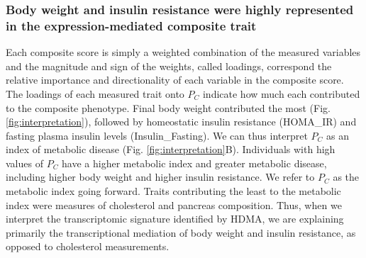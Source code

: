 \documentclass[
]{article}
\begin{document}
\subsubsection{Body weight and insulin resistance were highly
represented in the expression-mediated composite
trait}\label{body-weight-and-insulin-resistance-were-highly-represented-in-the-expression-mediated-composite-trait}

Each composite score is simply a weighted combination of the measured
variables and the magnitude and sign of the weights, called loadings,
correspond the relative importance and directionality of each variable
in the composite score. The loadings of each measured trait onto \(P_C\)
indicate how much each contributed to the composite phenotype. Final
body weight contributed the most (Fig. \ref{fig:interpretation}),
followed by homeostatic insulin resistance (HOMA\_IR) and fasting plasma
insulin levels (Insulin\_Fasting). We can thus interpret \(P_C\) as an
index of metabolic disease (Fig. \ref{fig:interpretation}B). Individuals
with high values of \(P_C\) have a higher metabolic index and greater
metabolic disease, including higher body weight and higher insulin
resistance. We refer to \(P_C\) as the metabolic index going forward.
Traits contributing the least to the metabolic index were measures of
cholesterol and pancreas composition. Thus, when we interpret the
transcriptomic signature identified by HDMA, we are explaining primarily
the transcriptional mediation of body weight and insulin resistance, as
opposed to cholesterol measurements.
\end{document}

